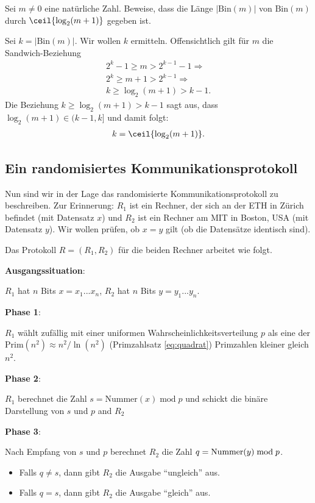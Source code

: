 \begin{Exercise}
Sei $m \neq 0$ eine natürliche Zahl. Beweise, dass die Länge $|\text{Bin}(m)|$ von $\text{Bin}(m)$ durch $\ceil{\log_2(m+1)}$ gegeben ist.
\end{Exercise}


\begin{Answer}
Sei $k = |\text{Bin}(m)|$. Wir wollen $k$ ermitteln. Offensichtlich gilt für $m$ die Sandwich-Beziehung
\begin{align*}
    2^k-1 \geq m > 2^{k-1} - 1 \Rightarrow \\
    2^k \geq m+1 > 2^{k-1} \Rightarrow \\
    k \geq \log_2(m+1) > k-1.
\end{align*}
Die Beziehung $k \geq \log_2(m+1) > k-1$ sagt aus, dass $\log_2(m+1)\in (k-1,k]$ und damit folgt:
\begin{align*}
    k = \ceil{\log_2(m+1)}.
\end{align*}
\end{Answer}




\clearpage
\subsection{Ein randomisiertes Kommunikationsprotokoll}
Nun sind wir in der Lage das randomisierte Kommunikationsprotokoll zu beschreiben. Zur Erinnerung: $R_1$ ist ein Rechner, der sich an der ETH in Zürich befindet (mit Datensatz $x$) und $R_2$ ist ein Rechner am MIT in Boston, USA (mit Datensatz $y$). Wir wollen prüfen, ob $x = y$ gilt (ob die Datensätze identisch sind).

Das Protokoll $R = (R_1,R_2)$ für die beiden Rechner arbeitet wie folgt.
\begin{mdframed}[backgroundcolor=green!20,roundcorner=10pt,userdefinedwidth=16cm,align=center]
\textbf{Ausgangssituation}:

$R_1$ hat $n$ Bits $x=x_1...x_n$, $R_2$ hat $n$ Bits $y = y_1...y_n$.

\textbf{Phase 1}:

$R_1$ wählt zufällig mit einer uniformen Wahrscheinlichkeitsverteilung $p$ als eine der $\text{Prim}(n^2)\approx n^2/\ln(n^2)$ (Primzahlsatz \ref{eq:quadrat}) Primzahlen kleiner gleich $n^2$.


\textbf{Phase 2}:

$R_1$ berechnet die Zahl $s = \text{Nummer}(x)\; \text{mod} \; p$ und schickt die binäre Darstellung von $s$ und $p$ and $R_2$


\textbf{Phase 3}:

Nach Empfang von $s$ und $p$ berechnet $R_2$ die Zahl $q = \text{Nummer}(y)\; \text{\text{mod}} \; p$.
\begin{itemize}
    \item Falls $q\neq s$, dann gibt $R_2$ die Ausgabe ``ungleich'' aus.
    \item Falls $q = s$, dann gibt $R_2$ die Ausgabe ``gleich'' aus.
\end{itemize}
\end{mdframed}



